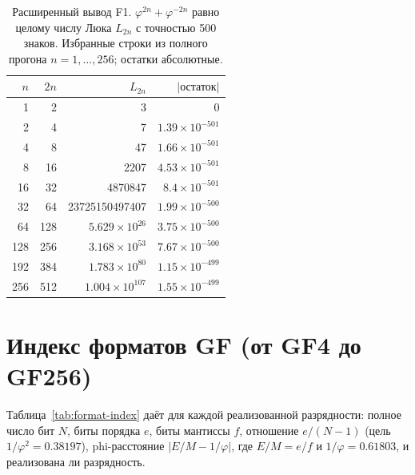 \documentclass[11pt,a4paper]{article}
\theoremstyle{plain}
\begin{document}
\begin{table}[t]
\centering
\caption{Расширенный вывод F1. \(\varphi^{2n} + \varphi^{-2n}\) равно целому
числу Люка \(L_{2n}\) с точностью 500 знаков. Избранные строки из полного
прогона \(n = 1,\dots,256\); остатки абсолютные.}
\label{tab:f1-extended}
\small
\begin{tabular}{rrrr}
\toprule
$n$ & $2n$ & $L_{2n}$ & $|\text{остаток}|$ \\
\midrule
1   & 2   & 3                         & 0 \\
2   & 4   & 7                         & $1.39 \times 10^{-501}$ \\
4   & 8   & 47                        & $1.66 \times 10^{-501}$ \\
8   & 16  & 2207                      & $4.53 \times 10^{-501}$ \\
16  & 32  & 4870847                   & $8.4 \times 10^{-501}$ \\
32  & 64  & 23725150497407            & $1.99 \times 10^{-500}$ \\
64  & 128 & $5.629 \times 10^{26}$    & $3.75 \times 10^{-500}$ \\
128 & 256 & $3.168 \times 10^{53}$    & $7.67 \times 10^{-500}$ \\
192 & 384 & $1.783 \times 10^{80}$    & $1.15 \times 10^{-499}$ \\
256 & 512 & $1.004 \times 10^{107}$   & $1.55 \times 10^{-499}$ \\
\bottomrule
\end{tabular}
\end{table}

\section{Индекс форматов GF (от GF4 до GF256)}\label{app:format-index}

Таблица~\ref{tab:format-index} даёт для каждой реализованной разрядности: полное
число бит \(N\), биты порядка \(e\), биты мантиссы \(f\), отношение \(e/(N-1)\)
(цель \(1/\varphi^{2} = 0.38197\)), phi-расстояние \(|E/M - 1/\varphi|\),
где \(E/M = e/f\) и \(1/\varphi = 0.61803\), и реализована ли разрядность.
\end{document}
